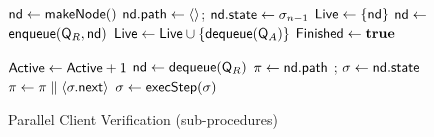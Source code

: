 \clearpage
\begin{figure}[ht]
\begin{minipage}{\textwidth}
\begin{algorithm}[H] %
\caption{Parallel Client Verification (sub-procedures)}
\begin{algorithmic}[1]

  \label{fig:paralg:nodeScheduler}
  \State $\mathsf{nd} \gets \mathsf{makeNode}()$
  \label{fig:paralg:makeRoot}
  \State $\mathsf{nd}.\mathsf{path} \gets \langle\rangle$; $\mathsf{nd}.\mathsf{state} \gets \sigma_{n-1}$
  \label{fig:paralg:initRoot}
  \State $\mathsf{Live} \gets \{\mathsf{nd}\}$
  \label{fig:paralg:initLiveSet}
  \While{$\verifyFinished =  \codeFalse$}
  \label{fig:paralg:nodeSchedulerWhile}
    \label{fig:paralg:ifEnqueueReady}
    \State $\mathsf{nd} \gets$ \Call{\selectNode}{\liveSet, \trainingFrags{\msgNmbr}}
    \label{fig:paralg:editDist}
      \State \Atomic $\mathsf{enqueue}(\mathsf{Q}_{R}, \mathsf{nd})$ 
      \label{fig:paralg:enqueueReady}
    \EndIf
    \label{fig:paralg:ifAdded}
      \State \Atomic $\mathsf{Live} \gets \mathsf{Live} \cup \{\mathsf{dequeue}(\mathsf{Q}_{A})\}$
      \label{fig:paralg:dequeueAdded}
    \EndWhile
    \label{fig:paralg:ifEmpty}
      \State $\mathsf{Finished} \gets \textbf{true}$
      \label{fig:paralg:emptyLive}
    \EndIf
  \EndWhile
\EndProcedure

\State

\Procedure{\verifyWorker}{\msg{\msgNmbr}, \readyQ, \addedQ, \activeCount, \verifyFinished, \validState}
\label{fig:paralg:verifyWorker}
\While{$\verifyFinished = \codeFalse$}
  \label{fig:paralg:verifyWorkerWhile}
  \label{fig:paralg:ifDequeueReady}
    \State \Atomic $\mathsf{Active} \gets \mathsf{Active} + 1$
    \State \Atomic $\mathsf{nd} \gets \mathsf{dequeue}(\mathsf{Q}_{R})$
    \label{fig:paralg:dequeue}
    \If{$\node \neq \bot$}
      \label{fig:paralg:ifNode}
      \State $\pi \gets \mathsf{nd}.\mathsf{path}$ ; $\sigma \gets \mathsf{nd}.\mathsf{state}$ 
        \label{fig:paralg:whileSymEx}
        \State $\pi \gets \pi \parallel \langle \sigma.\mathsf{next} \rangle$
        \label{fig:paralg:extendPath}
        \State $\sigma \gets \mathsf{execStep}(\sigma)$
        \label{fig:paralg:execStep}
      \EndWhile
      

\end{algorithmic}
\end{algorithm}
\end{minipage}
\end{figure}
